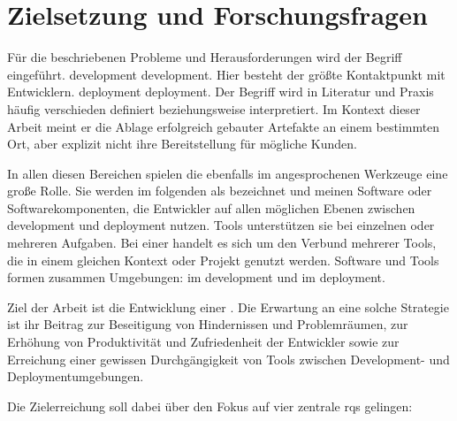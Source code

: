 \section{Zielsetzung und Forschungsfragen}
\label{sec:01-03_objectives-and-research-questions}

Für die beschriebenen Probleme und Herausforderungen wird der Begriff  eingeführt. \Gls{development} \glsdesc{development}. Hier besteht der größte Kontaktpunkt mit Entwicklern. \Gls{deployment} \glsdesc{deployment}. Der Begriff wird in Literatur und Praxis häufig verschieden definiert beziehungsweise interpretiert. Im Kontext dieser Arbeit meint er die Ablage erfolgreich gebauter Artefakte an einem bestimmten Ort, aber explizit nicht ihre Bereitstellung für mögliche Kunden.

In allen diesen Bereichen spielen die ebenfalls im  angesprochenen Werkzeuge eine große Rolle. Sie werden im folgenden als  bezeichnet und meinen Software oder Softwarekomponenten, die Entwickler auf allen möglichen Ebenen zwischen \Gls{development} und \Gls{deployment} nutzen. Tools unterstützen sie bei einzelnen oder mehreren Aufgaben. Bei einer  handelt es sich um den Verbund mehrerer Tools, die in einem gleichen Kontext oder Projekt genutzt werden. Software und Tools formen zusammen Umgebungen:  im \Gls{development} und  im \Gls{deployment}.

Ziel der Arbeit ist die Entwicklung einer . Die Erwartung an eine solche Strategie ist ihr Beitrag zur Beseitigung von Hindernissen und Problemräumen, zur Erhöhung von Produktivität und Zufriedenheit der Entwickler sowie zur Erreichung einer gewissen Durchgängigkeit von Tools zwischen Development- und Deploymentumgebungen.

Die Zielerreichung soll dabei über den Fokus auf vier zentrale \Glspl{rq} gelingen:


